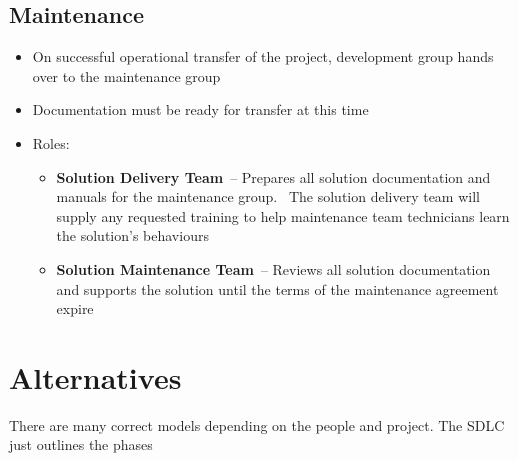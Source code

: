 \documentclass{article}[18pt]
\begin{document}
\subsection{Maintenance}
\begin{itemize}
	\item On successful operational transfer of the project, development group hands over to the maintenance group
	\item Documentation must be ready for transfer at this time
	\item Roles:
	\begin{itemize}
		\item \textbf{Solution Delivery Team} – Prepares all solution documentation 
		and manuals for the maintenance group.  The solution delivery 
		team will supply any requested training to help maintenance 
		team technicians learn the solution’s behaviours
		\item \textbf{Solution Maintenance Team} – Reviews all solution 
		documentation and supports the solution until the terms 
		of the maintenance agreement expire
	\end{itemize}
\end{itemize}
\section{Alternatives}
There are many correct models depending on the people and project. The SDLC just outlines the phases
\end{document}
